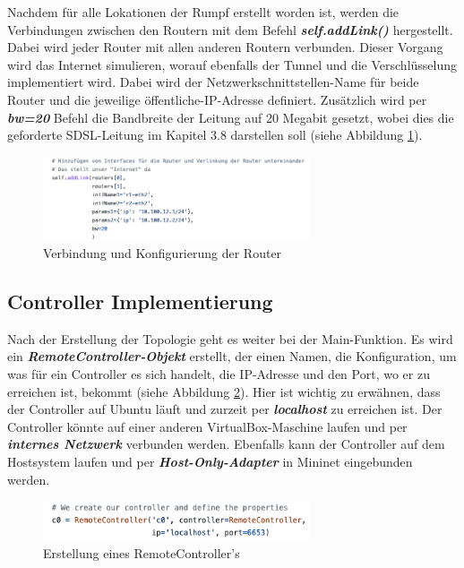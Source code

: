 \documentclass[fontsize=12pt,paper=a4,open=any,parskip=half,
  twoside=false,toc=listof,toc=bibliography,fleqn,leqno,
  captions=nooneline,captions=tableabove,british]{scrbook}
\begin{document}
Nachdem für alle Lokationen der Rumpf erstellt worden ist, werden die Verbindungen zwischen den Routern mit dem Befehl \textit{\textbf{self.addLink()}} hergestellt. Dabei wird jeder Router mit allen anderen Routern verbunden. Dieser Vorgang wird das Internet simulieren, worauf ebenfalls der Tunnel und die Verschlüsselung implementiert wird. Dabei wird der Netzwerkschnittstellen-Name für beide Router und die jeweilige öffentliche-IP-Adresse definiert. Zusätzlich wird per \textit{\textbf{bw=20}} Befehl die Bandbreite der Leitung auf 20 Megabit gesetzt, wobei dies die geforderte SDSL-Leitung im Kapitel 3.8 darstellen soll (siehe Abbildung \ref{mininet4}).

\begin{figure}[H]
 \centering
 \includegraphics[width=0.7\textwidth]{Bilder/mininet4}
 \captionsetup{justification=centering,margin=1cm}
 \caption{Verbindung und Konfigurierung der Router}
 \label{mininet4}
\end{figure}




\newpage
\subsection{Controller Implementierung}
Nach der Erstellung der Topologie geht es weiter bei der Main-Funktion. Es wird ein \textit{\textbf{RemoteController-Objekt}} erstellt, der einen Namen, die Konfiguration, um was für ein Controller es sich handelt, die IP-Adresse und den Port, wo er zu erreichen ist, bekommt (siehe Abbildung \ref{mininet5}). Hier ist wichtig zu erwähnen, dass der Controller auf Ubuntu läuft und zurzeit per \textit{\textbf{localhost}} zu erreichen ist. Der Controller könnte auf einer anderen VirtualBox-Maschine laufen und per \textit{\textbf{internes Netzwerk}} verbunden werden. Ebenfalls kann der Controller auf dem Hostsystem laufen und per \textit{\textbf{Host-Only-Adapter}} in Mininet eingebunden werden. 

\begin{figure}[H]
 \centering
 \includegraphics[width=0.7\textwidth]{Bilder/mininet5}
 \captionsetup{justification=centering,margin=1cm}
 \caption{Erstellung eines RemoteController's}
 \label{mininet5}
\end{figure}
\end{document}
